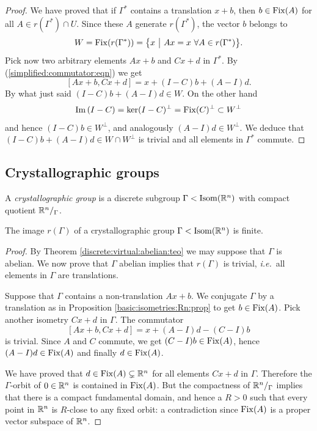 \begin{proof}
We have proved that if $\Gamma^*$ contains a translation $x+b$, then $b\in {\rm Fix}(A)$ for all $A\in r(\Gamma^*)\cap U$. Since these $A$ generate $r(\Gamma^*)$, the vector $b$ belongs to 
$$W = \Fix(r(\Gamma^*)) = \big\{x\ \big|\ Ax = x\ \forall A \in r(\Gamma^*)\big\}.$$
Pick now two arbitrary elements $Ax+b$ and $Cx+d$ in $\Gamma^*$.
By (\ref{simplified:commutator:eqn}) we get
$$[Ax+b, Cx+d] = x+(I-C)b+(A-I)d.$$
By what just said $(I-C)b+(A-I)d \in W$. On the other hand 
$${\rm Im\,} (I-C) = \ker(I-C)^\perp = {\rm Fix}(C)^\perp \subset W^\perp$$ 
and hence $(I-C)b\in W^\perp$, and analogously $(A-I)d \in W^\perp$. We deduce that $(I-C)b+(A-I)d \in W \cap W^\perp$ is trivial and all elements in $\Gamma^*$ commute.
\end{proof}


\subsection{Crystallographic groups} \label{crystallographic:subsection}
A \emph{crystallographic group} is a discrete subgroup $\Gamma <{\rm Isom}(\mathbb{R}^n)$ with compact quotient $\mathbb{R}^n/_\Gamma$.

\begin{prop} \label{finite:image:r:prop}
The image $r(\Gamma)$ of a crystallographic group $\Gamma<{\rm Isom}(\mathbb{R}^n)$ is finite. 
\end{prop}
\begin{proof}
By Theorem \ref{discrete:virtual:abelian:teo} we may suppose that $\Gamma$ is abelian. We now prove that $\Gamma$ abelian implies that $r(\Gamma)$ is trivial, \emph{i.e.}~all elements in $\Gamma$ are translations.

Suppose that $\Gamma$ contains a non-translation $Ax +b$. We conjugate $\Gamma$ by a translation as in Proposition \ref{basic:isometries:Rn:prop} to get $b\in {\rm Fix}(A)$. Pick another isometry $Cx+d$ in $\Gamma$. The commutator
$$[Ax +b, Cx +d] = x+(A-I)d-(C-I)b$$
is trivial. Since $A$ and $C$ commute, we get $(C-I)b \in {\rm Fix}(A)$, hence $(A-I)
d\in {\rm Fix} (A)$ and finally $d\in {\rm Fix}(A)$.

We have proved that $d\in {\rm Fix}(A)\subsetneq \mathbb{R}^n$ for all elements $Cx+d$ in $\Gamma$. Therefore the $\Gamma$-orbit of $0\in\mathbb{R}^n$ is contained in ${\rm Fix}(A)$. But the compactness of $\mathbb{R}^n/_\Gamma$ implies that there is a compact fundamental domain, and hence a $R>0$ such that every point in $\mathbb{R}^n$ is $R$-close to any fixed orbit: a contradiction since ${\rm Fix}(A)$ is a proper vector subspace of $\mathbb{R}^n$.
\end{proof}

